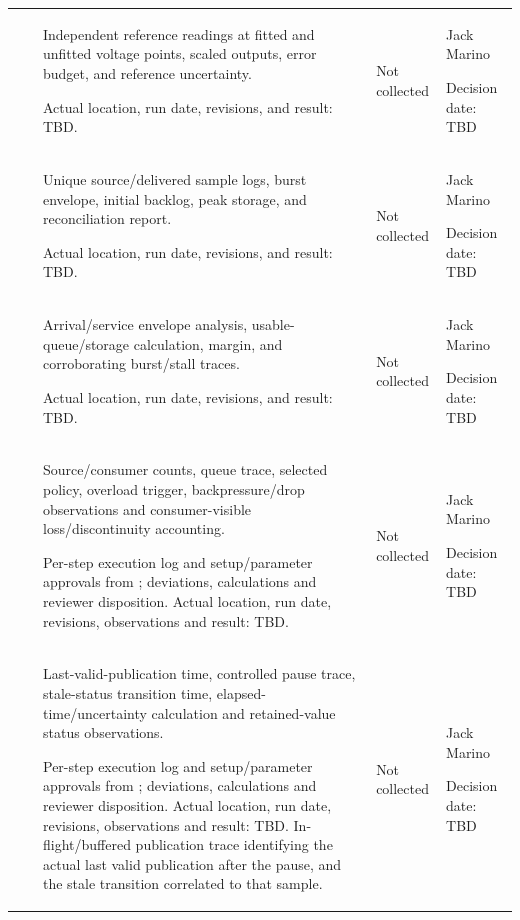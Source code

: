 \begin{landscape}
\begin{tabularx}{\linewidth}{L{2.0cm}L{3.3cm}Y L{2.3cm}L{2.6cm}}
 & \par {} & Independent reference readings at fitted and unfitted voltage points, scaled outputs, error budget, and reference uncertainty.\par Actual location, run date, revisions, and result: TBD. & Not collected & Jack Marino\par Decision date: TBD\\
 & \par {} & Unique source/delivered sample logs, burst envelope, initial backlog, peak storage, and reconciliation report.\par Actual location, run date, revisions, and result: TBD. & Not collected & Jack Marino\par Decision date: TBD\\
 & \par {} & Arrival/service envelope analysis, usable-queue/storage calculation, margin, and corroborating burst/stall traces.\par Actual location, run date, revisions, and result: TBD. & Not collected & Jack Marino\par Decision date: TBD\\
 & \par {} & Source/consumer counts, queue trace, selected policy, overload trigger, backpressure/drop observations and consumer-visible loss/discontinuity accounting.\par Per-step execution log and setup/parameter approvals from ; deviations, calculations and reviewer disposition. Actual location, run date, revisions, observations and result: TBD. & Not collected & Jack Marino\par Decision date: TBD\\
 & \par {} & Last-valid-publication time, controlled pause trace, stale-status transition time, elapsed-time/uncertainty calculation and retained-value status observations.\par Per-step execution log and setup/parameter approvals from ; deviations, calculations and reviewer disposition. Actual location, run date, revisions, observations and result: TBD. In-flight/buffered publication trace identifying the actual last valid publication after the pause, and the stale transition correlated to that sample. & Not collected & Jack Marino\par Decision date: TBD\\

\end{tabularx}
\end{landscape}
